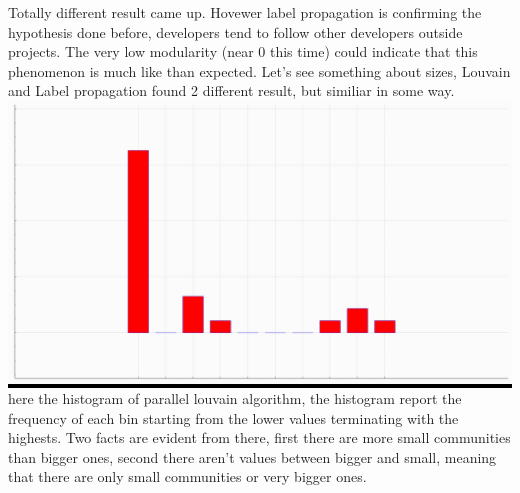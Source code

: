 \documentclass[]{article}
\begin{document}
    Totally different result came up. Hovewer label propagation is confirming the hypothesis done before, developers tend to follow other developers outside projects. The very low modularity (near 0 this time) could indicate that this phenomenon is much like than expected. Let's see something about sizes, Louvain and Label propagation found 2 different result, but similiar in some way.\\
    \colorbox{black}{\includegraphics[width=15cm,height = 7.5cm]{charts/hist_cluster_sizePLM.png}}\\
    here the histogram of parallel louvain algorithm, the histogram report the frequency of each bin starting from the lower values terminating with the highests. Two facts are evident from there, first there are more small communities than bigger ones, second there aren't values between bigger and small, meaning that there are only small communities or very bigger ones. 
\end{document}
